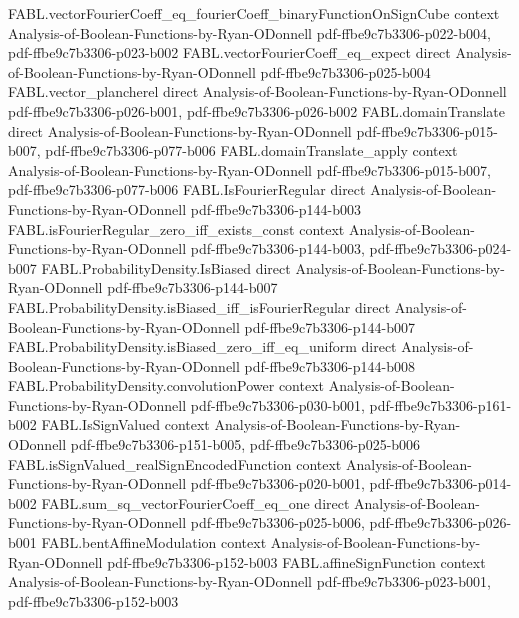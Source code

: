 \begin{theorem}
\proofstep
  {FABL.vectorFourierCoeff_eq_fourierCoeff_binaryFunctionOnSignCube}
  {context}
  {Analysis-of-Boolean-Functions-by-Ryan-ODonnell}
  {pdf-ffbe9c7b3306-p022-b004,
    pdf-ffbe9c7b3306-p023-b002}
\proofstep
  {FABL.vectorFourierCoeff_eq_expect}
  {direct}
  {Analysis-of-Boolean-Functions-by-Ryan-ODonnell}
  {pdf-ffbe9c7b3306-p025-b004}
\proofstep
  {FABL.vector_plancherel}
  {direct}
  {Analysis-of-Boolean-Functions-by-Ryan-ODonnell}
  {pdf-ffbe9c7b3306-p026-b001,
    pdf-ffbe9c7b3306-p026-b002}
\proofstep
  {FABL.domainTranslate}
  {direct}
  {Analysis-of-Boolean-Functions-by-Ryan-ODonnell}
  {pdf-ffbe9c7b3306-p015-b007,
    pdf-ffbe9c7b3306-p077-b006}
\proofstep
  {FABL.domainTranslate_apply}
  {context}
  {Analysis-of-Boolean-Functions-by-Ryan-ODonnell}
  {pdf-ffbe9c7b3306-p015-b007,
    pdf-ffbe9c7b3306-p077-b006}
\proofstep
  {FABL.IsFourierRegular}
  {direct}
  {Analysis-of-Boolean-Functions-by-Ryan-ODonnell}
  {pdf-ffbe9c7b3306-p144-b003}
\proofstep
  {FABL.isFourierRegular_zero_iff_exists_const}
  {context}
  {Analysis-of-Boolean-Functions-by-Ryan-ODonnell}
  {pdf-ffbe9c7b3306-p144-b003,
    pdf-ffbe9c7b3306-p024-b007}
\proofstep
  {FABL.ProbabilityDensity.IsBiased}
  {direct}
  {Analysis-of-Boolean-Functions-by-Ryan-ODonnell}
  {pdf-ffbe9c7b3306-p144-b007}
\proofstep
  {FABL.ProbabilityDensity.isBiased_iff_isFourierRegular}
  {direct}
  {Analysis-of-Boolean-Functions-by-Ryan-ODonnell}
  {pdf-ffbe9c7b3306-p144-b007}
\proofstep
  {FABL.ProbabilityDensity.isBiased_zero_iff_eq_uniform}
  {direct}
  {Analysis-of-Boolean-Functions-by-Ryan-ODonnell}
  {pdf-ffbe9c7b3306-p144-b008}
\proofstep
  {FABL.ProbabilityDensity.convolutionPower}
  {context}
  {Analysis-of-Boolean-Functions-by-Ryan-ODonnell}
  {pdf-ffbe9c7b3306-p030-b001,
    pdf-ffbe9c7b3306-p161-b002}
\proofstep
  {FABL.IsSignValued}
  {context}
  {Analysis-of-Boolean-Functions-by-Ryan-ODonnell}
  {pdf-ffbe9c7b3306-p151-b005,
    pdf-ffbe9c7b3306-p025-b006}
\proofstep
  {FABL.isSignValued_realSignEncodedFunction}
  {context}
  {Analysis-of-Boolean-Functions-by-Ryan-ODonnell}
  {pdf-ffbe9c7b3306-p020-b001,
    pdf-ffbe9c7b3306-p014-b002}
\proofstep
  {FABL.sum_sq_vectorFourierCoeff_eq_one}
  {direct}
  {Analysis-of-Boolean-Functions-by-Ryan-ODonnell}
  {pdf-ffbe9c7b3306-p025-b006,
    pdf-ffbe9c7b3306-p026-b001}
\proofstep
  {FABL.bentAffineModulation}
  {context}
  {Analysis-of-Boolean-Functions-by-Ryan-ODonnell}
  {pdf-ffbe9c7b3306-p152-b003}
\proofstep
  {FABL.affineSignFunction}
  {context}
  {Analysis-of-Boolean-Functions-by-Ryan-ODonnell}
  {pdf-ffbe9c7b3306-p023-b001,
    pdf-ffbe9c7b3306-p152-b003}

\end{theorem}

